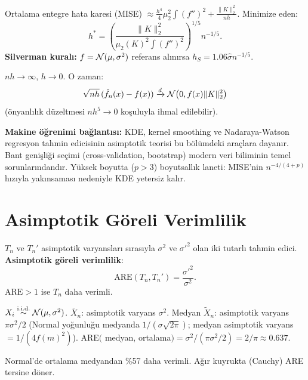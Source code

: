 \begin{sonuc}\label{cor:silverman}
Ortalama entegre hata karesi (MISE) $\approx \frac{h^4}{4}\mu_2^2\int(f'')^2 + \frac{\|K\|_2^2}{nh}$. Minimize eden:
\[
  h^* = \left(\frac{\|K\|_2^2}{\mu_2(K)^2\int(f'')^2}\right)^{1/5} n^{-1/5}.
\]
\textbf{Silverman kuralı:} $f=\mathcal{N}(\mu,\sigma^2)$ referans alınırsa $h_S = 1.06\hat\sigma n^{-1/5}$.
\end{sonuc}

\begin{teorem}\label{thm:kde_normal}
$nh\to\infty$, $h\to0$. O zaman:
\[
  \sqrt{nh}\,(\hat f_n(x) - f(x)) \xrightarrow{d} \mathcal{N}\!\left(0, f(x)\|K\|_2^2\right)
\]
(önyanlılık düzeltmesi $nh^5\to0$ koşuluyla ihmal edilebilir).
\end{teorem}

\begin{disiplinlerarasibaglan}
\textbf{Makine öğrenimi bağlantısı:} KDE, kernel smoothing ve Nadaraya-Watson regresyon tahmin edicisinin asimptotik teorisi bu bölümdeki araçlara dayanır. Bant genişliği seçimi (cross-validation, bootstrap) modern veri biliminin temel sorunlarındandır. Yüksek boyutta ($p>3$) boyutsallık laneti: MISE'nin $n^{-4/(4+p)}$ hızıyla yakınsaması nedeniyle KDE yetersiz kalır.
\end{disiplinlerarasibaglan}

\section{Asimptotik Göreli Verimlilik}
\label{sec:asimptotik_verimlilik}

\begin{tanim}[ARE]\label{def:are}
$T_n$ ve $T_n'$ asimptotik varyansları sırasıyla $\sigma^2$ ve $\sigma'^2$ olan iki tutarlı tahmin edici. \textbf{Asimptotik göreli verimlilik}:
\[
  \mathrm{ARE}(T_n,T_n') = \frac{\sigma'^2}{\sigma^2}.
\]
$\mathrm{ARE}>1$ ise $T_n$ daha verimli.
\end{tanim}

\begin{ornek}
$X_i\overset{\text{i.i.d.}}{\sim}\mathcal{N}(\mu,\sigma^2)$. $\bar{X}_n$: asimptotik varyans $\sigma^2$. Medyan $\tilde{X}_n$: asimptotik varyans $\pi\sigma^2/2$ (Normal yoğunluğu medyanda $1/(\sigma\sqrt{2\pi})$; medyan asimptotik varyans $= 1/(4f(m)^2)$). ARE$($ medyan, ortalama$) = \sigma^2/(\pi\sigma^2/2) = 2/\pi \approx 0.637$.

Normal'de ortalama medyandan \%57 daha verimli. Ağır kuyrukta (Cauchy) ARE tersine döner.
\end{ornek}

